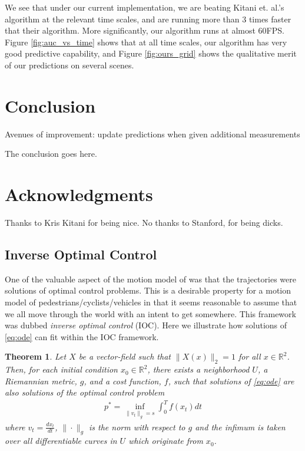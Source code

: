 \documentclass[conference]{IEEEtran}
\newtheorem{thm}{Theorem}
\begin{document}
We see that under our current implementation, we are beating Kitani et. al.'s algorithm at the relevant time scales, and are running more than 3 times faster that their algorithm. More significantly, our algorithm runs at almost 60FPS. Figure \ref{fig:auc_vs_time} shows that at all time scales, our algorithm has very good predictive capability, and Figure \ref{fig:ours_grid} shows the qualitative merit of our predictions on several scenes.



\section{Conclusion} 
\label{sec:conclusion}

Avenues of improvement:
update predictions when given additional measurements

The conclusion goes here.

\section*{Acknowledgments}
Thanks to Kris Kitani for being nice.  No thanks to Stanford, for being dicks.

\appendix
\subsection{Inverse Optimal Control} \label{app:ioc}
One of the valuable aspect of the motion model of \cite{Kitani2012} was that the trajectories were solutions of optimal control problems.
This is a desirable property for a motion model of pedestrians/cyclists/vehicles in that it seems reasonable to assume that we all move through the world with an intent to get somewhere.
This framework was dubbed \emph{inverse optimal control} (IOC).
Here we illustrate how solutions of \eqref{eq:ode} can fit within the IOC framework.

\begin{thm}
	Let $X$ be a vector-field such that $\| X(x) \|_2 = 1$ for all $x \in \mathbb{R}^2$.
Then, for each initial condition $x_0 \in \mathbb{R}^2$, there exists a neighborhood $U$, a Riemannian metric, $g$, and a cost function, $f$, 
such that solutions of \eqref{eq:ode} are also solutions of the optimal control problem
\begin{align}
	p^* = \inf_{ \| v_t \|_g = s } \int_0^T f( x_t) dt \label{eq:IOC}
\end{align}
where $v_t = \frac{d x_t}{dt}$, $\| \cdot \|_g$ is the norm with respect to $g$ and the infimum is taken over all differentiable curves in $U$ which originate from $x_0$.
\end{thm}
\end{document}
